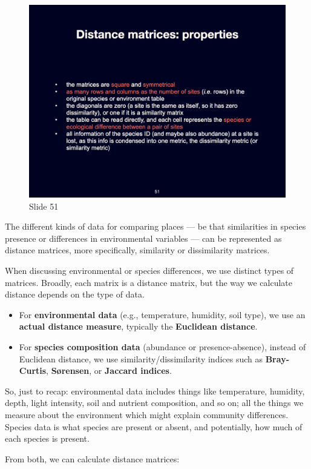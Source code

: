 \documentclass[
  10pt,
]{book}
\providecommand{\tightlist}{%
  \setlength{\itemsep}{0pt}\setlength{\parskip}{0pt}}
\begin{document}
\begin{figure}[ht]
\centering
\includegraphics[width=0.8\linewidth]{../images/BDC334/BDC334-051.jpeg}
\caption*{Slide 51}
\end{figure}

The different kinds of data for comparing places --- be that
similarities in species presence or differences in environmental
variables --- can be represented as distance matrices, more
specifically, similarity or dissimilarity matrices.

When discussing environmental or species differences, we use distinct
types of matrices. Broadly, each matrix is a distance matrix, but the
way we calculate distance depends on the type of data.

\begin{itemize}
\tightlist
\item
  For \textbf{environmental data} (e.g., temperature, humidity, soil
  type), we use an \textbf{actual distance measure}, typically the
  \textbf{Euclidean distance}.
\item
  For \textbf{species composition data} (abundance or presence-absence),
  instead of Euclidean distance, we use similarity/dissimilarity indices
  such as \textbf{Bray-Curtis}, \textbf{Sørensen}, or \textbf{Jaccard
  indices}.
\end{itemize}

So, just to recap: environmental data includes things like temperature,
humidity, depth, light intensity, soil and nutrient composition, and so
on; all the things we measure about the environment which might explain
community differences. Species data is what species are present or
absent, and potentially, how much of each species is present.

From both, we can calculate distance matrices:
\end{document}
